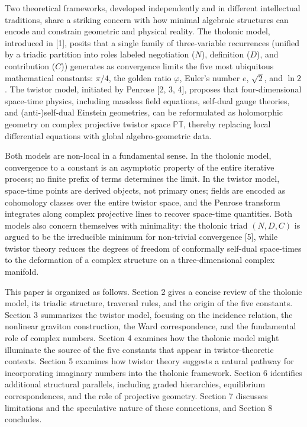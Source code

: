\documentclass[
  11pt,
  letterpaper,
]{article}
\begin{document}
Two theoretical frameworks, developed independently and in different
intellectual traditions, share a striking concern with how minimal
algebraic structures can encode and constrain geometric and physical
reality. The tholonic model, introduced in {[}1{]}, posits that a single
family of three-variable recurrences (unified by a triadic partition
into roles labeled negotiation (\(N\)), definition (\(D\)), and
contribution (\(C\))) generates as convergence limits the five most
ubiquitous mathematical constants: \(\pi/4\), the golden ratio
\(\varphi\), Euler's number \(e\), \(\sqrt{2}\), and \(\ln 2\). The
twistor model, initiated by Penrose {[}2, 3, 4{]}, proposes that
four-dimensional space-time physics, including massless field equations,
self-dual gauge theories, and (anti-)self-dual Einstein geometries, can
be reformulated as holomorphic geometry on complex projective twistor
space \(\mathbb{PT}\), thereby replacing local differential equations
with global algebro-geometric data.

Both models are non-local in a fundamental sense. In the tholonic model,
convergence to a constant is an asymptotic property of the entire
iterative process; no finite prefix of terms determines the limit. In
the twistor model, space-time points are derived objects, not primary
ones; fields are encoded as cohomology classes over the entire twistor
space, and the Penrose transform integrates along complex projective
lines to recover space-time quantities. Both models also concern
themselves with minimality: the tholonic triad \((N, D, C)\) is argued
to be the irreducible minimum for non-trivial convergence {[}5{]}, while
twistor theory reduces the degrees of freedom of conformally self-dual
space-times to the deformation of a complex structure on a
three-dimensional complex manifold.

This paper is organized as follows. Section 2 gives a concise review of
the tholonic model, its triadic structure, traversal rules, and the
origin of the five constants. Section 3 summarizes the twistor model,
focusing on the incidence relation, the nonlinear graviton construction,
the Ward correspondence, and the fundamental role of complex numbers.
Section 4 examines how the tholonic model might illuminate the source of
the five constants that appear in twistor-theoretic contexts. Section 5
examines how twistor theory suggests a natural pathway for incorporating
imaginary numbers into the tholonic framework. Section 6 identifies
additional structural parallels, including graded hierarchies,
equilibrium correspondences, and the role of projective geometry.
Section 7 discusses limitations and the speculative nature of these
connections, and Section 8 concludes.
\end{document}
